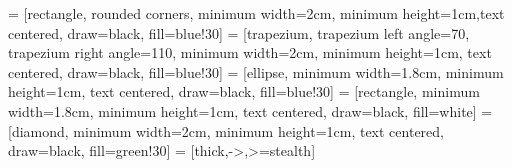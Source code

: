 \usepackage[utf8]{inputenc}
\usepackage{pdfpages}

\usepackage{amsmath,amssymb}
\usepackage{bm} 

\usepackage{comment}


\usepackage{color}
\usepackage{colortbl}
\usepackage{graphicx}
\usepackage{hyperref}

\usepackage{todonotes}

\usepackage{pifont}
\usepackage{listings}


\usepackage{tikz}
\usetikzlibrary{shapes.geometric, arrows}

 = [rectangle, rounded corners, minimum width=2cm, minimum height=1cm,text centered, draw=black, fill=blue!30]
 = [trapezium, trapezium left angle=70, trapezium right angle=110, minimum width=2cm, minimum height=1cm, text centered, draw=black, fill=blue!30]
 = [ellipse, minimum width=1.8cm, minimum height=1cm, text centered, draw=black, fill=blue!30]
 = [rectangle, minimum width=1.8cm, minimum height=1cm, text centered, draw=black, fill=white]
 = [diamond, minimum width=2cm, minimum height=1cm, text centered, draw=black, fill=green!30]
 = [thick,->,>=stealth]

\usepackage{color}
\usepackage{xcolor}


\usepackage{listings}

